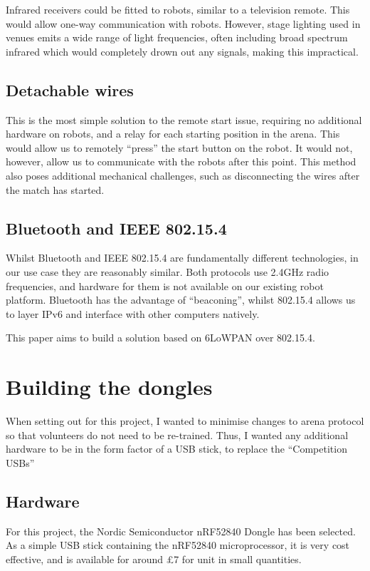 \documentclass[conference]{IEEEtran}
\begin{document}
Infrared receivers could be fitted to robots, similar to a television remote. This would allow one-way communication with robots. However, stage lighting used in venues emits a wide range of light frequencies, often including broad spectrum infrared which would completely drown out any signals, making this impractical.

\subsection{Detachable wires}

This is the most simple solution to the remote start issue, requiring no additional hardware on robots, and a relay for each starting position in the arena. This would allow us to remotely ``press'' the start button on the robot. It would not, however, allow us to communicate with the robots after this point. This method also poses additional mechanical challenges, such as disconnecting the wires after the match has started.

\subsection{Bluetooth and IEEE 802.15.4}

Whilst Bluetooth and IEEE 802.15.4 are fundamentally different technologies, in our use case they are reasonably similar. Both protocols use 2.4GHz radio frequencies, and hardware for them is not available on our existing robot platform. Bluetooth has the advantage of ``beaconing'', whilst 802.15.4 allows us to layer IPv6 and interface with other computers natively. 

This paper aims to build a solution based on 6LoWPAN over 802.15.4.

\section{Building the dongles}

When setting out for this project, I wanted to minimise changes to arena protocol so that volunteers do not need to be re-trained. Thus, I wanted any additional hardware to be in the form factor of a USB stick, to replace the ``Competition USBs''

\subsection{Hardware}

For this project, the Nordic Semiconductor nRF52840 Dongle has been selected. As a simple USB stick containing the nRF52840 microprocessor, it is very cost effective, and is available for around £7 for unit in small quantities.
\end{document}
